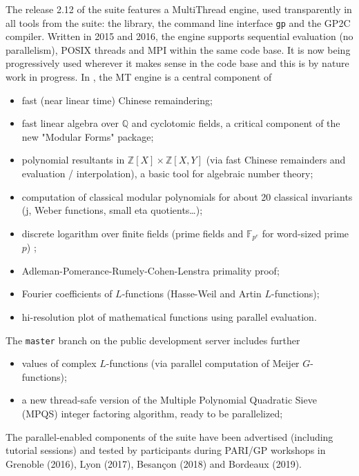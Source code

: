 The release 2.12 of the \PariGP suite features a MultiThread engine,
used transparently in all tools from the suite: the \Pari library, the
command line interface \texttt{gp} and the GP2C compiler. Written in 2015 and
2016, the engine supports sequential evaluation (no parallelism), POSIX
threads and MPI within the same code base. It is now being progressively
used wherever it makes sense in the code base and this is by nature work
in progress. In , the MT engine is a central component of
\begin{itemize}
\item fast (near linear time) Chinese remaindering;
\item fast linear algebra over $\mathbb{Q}$ and cyclotomic fields,
  a critical component of the new "Modular Forms" package;
\item polynomial resultants in
  $\mathbb{Z}[X] \times \mathbb{Z}[X,Y]$ (via fast Chinese remainders and
    evaluation / interpolation), a basic tool for algebraic number theory;
\item computation of classical modular polynomials for about 20 classical
invariants (j, Weber functions, small eta quotients\dots);
\item discrete logarithm over finite fields (prime fields and
$\mathbb{F}_{p^e}$ for word-sized prime $p$) ;
\item Adleman-Pomerance-Rumely-Cohen-Lenstra primality proof;
\item Fourier coefficients of $L$-functions (Hasse-Weil and Artin
  $L$-functions);
\item hi-resolution plot of mathematical functions using parallel evaluation.
\end{itemize}

The \texttt{master} branch on the public development server includes further
\begin{itemize}
  \item values of complex $L$-functions (via parallel computation of
    Meijer $G$-functions);
  \item a new thread-safe version of the Multiple Polynomial Quadratic Sieve
    (MPQS) integer factoring algorithm, ready to be parallelized;
\end{itemize}
The parallel-enabled components of the \PariGP suite have been advertised 
(including tutorial sessions) and tested by participants during PARI/GP
workshops in Grenoble (2016), Lyon (2017), Besançon (2018) and Bordeaux
(2019).

\medskip
\subparagraph{}
\label{hpc@hpc-gap}

